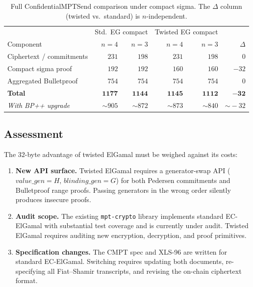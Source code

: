 \documentclass[11pt]{article}
\theoremstyle{definition}
\begin{document}
\begin{table}[htbp]
  \centering
  \caption{%
    Full \textsf{ConfidentialMPTSend} comparison under compact sigma.
    The $\Delta$ column (twisted vs.\ standard) is $n$-independent.}
  \label{tab:twisted-full}
  \begin{tabular}{l@{\quad}rr@{\quad}rr@{\quad}r}
    \toprule
    & \multicolumn{2}{c}{Std.\ EG compact}
    & \multicolumn{2}{c}{Twisted EG compact}
    & \\
    Component
      & $n{=}4$ & $n{=}3$
      & $n{=}4$ & $n{=}3$
      & $\Delta$ \\
    \midrule
    Ciphertext / commitments
      & $231$ & $198$
      & $231$ & $198$
      & $0$ \\
    Compact sigma proof
      & $192$ & $192$
      & $160$ & $160$
      & $-32$ \\
    Aggregated Bulletproof
      & $754$ & $754$
      & $754$ & $754$
      & $0$ \\
    \midrule
    \textbf{Total}
      & $\mathbf{1177}$ & $\mathbf{1144}$
      & $\mathbf{1145}$ & $\mathbf{1112}$
      & $\mathbf{-32}$ \\
    \midrule
    \textit{With BP++ upgrade}
      & $\sim 905$ & $\sim 872$
      & $\sim 873$ & $\sim 840$
      & $\sim\!-32$ \\
    \bottomrule
  \end{tabular}
\end{table}

\subsection{Assessment}
\label{sec:twisted-assessment}

The $32$-byte advantage of twisted ElGamal must be weighed against its
costs:

\begin{enumerate}[label=(\roman*)]
  \item \textbf{New API surface.}
        Twisted ElGamal requires a generator-swap API
        ($\mathit{value\_gen} = H$, $\mathit{blinding\_gen} = G$)
        for both Pedersen commitments and Bulletproof range proofs.
        Passing generators in the wrong order silently produces
        insecure proofs.

  \item \textbf{Audit scope.}
        The existing \texttt{mpt-crypto} library implements standard
        EC-ElGamal with substantial test coverage and is currently
        under audit.
        Twisted ElGamal requires auditing new encryption, decryption,
        and proof primitives.

  \item \textbf{Specification changes.}
        The CMPT spec and XLS-96 are written for standard EC-ElGamal.
        Switching requires updating both documents, re-specifying all
        Fiat--Shamir transcripts, and revising the on-chain ciphertext
        format.
\end{enumerate}
\end{document}
